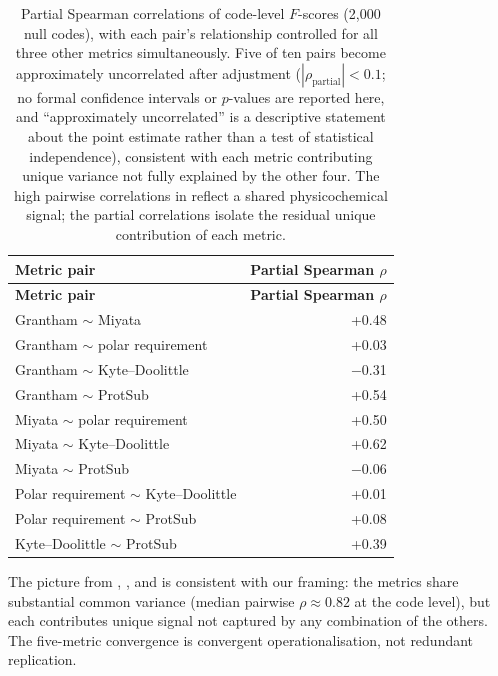 \documentclass[preprint,11pt,authoryear,a4paper]{elsarticle}
\begin{document}
\begin{longtable}[]{@{}lr@{}}
\caption{Partial Spearman correlations of code-level \(F\)-scores (2,000
null codes), with each pair's relationship controlled for all three
other metrics simultaneously. Five of ten pairs become approximately
uncorrelated after adjustment
(\(\left| \rho_{\text{partial}} \right| < 0.1\); no formal confidence
intervals or \(p\)-values are reported here, and ``approximately
uncorrelated'' is a descriptive statement about the point estimate
rather than a test of statistical independence), consistent with each
metric contributing unique variance not fully explained by the other
four. The high pairwise correlations in 
reflect a shared physicochemical signal; the partial correlations
isolate the residual unique contribution of each metric.}\tabularnewline
\toprule\noalign{}
\textbf{Metric pair} & \textbf{Partial Spearman \(\rho\)} \\
\midrule\noalign{}
\endfirsthead
\toprule\noalign{}
\textbf{Metric pair} & \textbf{Partial Spearman \(\rho\)} \\
\midrule\noalign{}
\endhead
\bottomrule\noalign{}
\endlastfoot
Grantham \(\sim\) Miyata & +0.48 \\
Grantham \(\sim\) polar requirement & +0.03 \\
Grantham \(\sim\) Kyte--Doolittle & \ensuremath{-}0.31 \\
Grantham \(\sim\) ProtSub & +0.54 \\
Miyata \(\sim\) polar requirement & +0.50 \\
Miyata \(\sim\) Kyte--Doolittle & +0.62 \\
Miyata \(\sim\) ProtSub & \ensuremath{-}0.06 \\
Polar requirement \(\sim\) Kyte--Doolittle & +0.01 \\
Polar requirement \(\sim\) ProtSub & +0.08 \\
Kyte--Doolittle \(\sim\) ProtSub & +0.39 \\
\end{longtable}

\protect{}\label{tbl:s-metric-partial}{}

The picture from ,
, and  is
consistent with our framing: the metrics share substantial common
variance (median pairwise \(\rho \approx 0.82\) at the code level), but
each contributes unique signal not captured by any combination of the
others. The five-metric convergence is convergent operationalisation,
not redundant replication.
\end{document}

